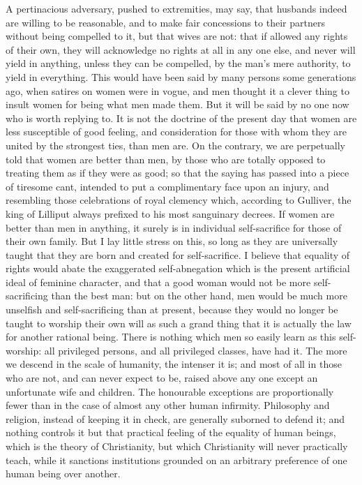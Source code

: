 \documentclass[12pt]{report}
\begin{document}
A pertinacious adversary, pushed to extremities, may say, that husbands indeed are willing to be reasonable, and to make fair concessions to their partners without being compelled to it, but that wives are not: that if allowed any rights of their own, they will acknowledge no rights at all in any one else, and never will yield in anything, unless they can be compelled, by the man's mere authority, to yield in everything. This would have been said by many persons some generations ago, when satires on women were in vogue, and men thought it a clever thing to insult women for being what men made them. But it will be said by no one now who is worth replying to. It is not the doctrine of the present day that women are less susceptible of good feeling, and consideration for those with whom they are united by the strongest ties, than men are. On the contrary, we are perpetually told that women are better than men, by those who are totally opposed to treating them as if they were as good; so that the saying has passed into a piece of tiresome cant, intended to put a complimentary face upon an injury, and resembling those celebrations of royal clemency which, according to Gulliver, the king of Lilliput always prefixed to his most sanguinary decrees. If women are better than men in anything, it surely is in individual self-sacrifice for those of their own family. But I lay little stress on this, so long as they are universally taught that they are born and created for self-sacrifice. I believe that equality of rights would abate the exaggerated self-abnegation which is the present artificial ideal of feminine character, and that a good woman would not be more self-sacrificing than the best man: but on the other hand, men would be much more unselfish and self-sacrificing than at present, because they would no longer be taught to worship their own will as such a grand thing that it is actually the law for another rational being. There is nothing which men so easily learn as this self-worship: all privileged persons, and all privileged classes, have had it. The more we descend in the scale of humanity, the intenser it is; and most of all in those who are not, and can never expect to be, raised above any one except an unfortunate wife and children. The honourable exceptions are proportionally fewer than in the case of almost any other human infirmity. Philosophy and religion, instead of keeping it in check, are generally suborned to defend it; and nothing controls it but that practical feeling of the equality of human beings, which is the theory of Christianity, but which Christianity will never practically teach, while it sanctions institutions grounded on an arbitrary preference of one human being over another.
\end{document}
